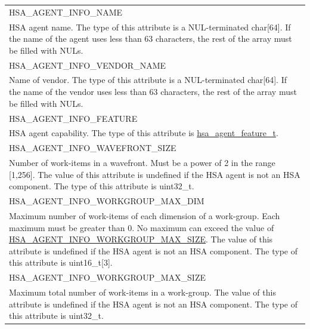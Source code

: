 \documentclass[final,oneside]{book}
\newcommand{\reftyp}[1]{#1}
\newcommand{\refenu}[1]{\reftyp{#1}}
\begin{document}
\begin{longtable}{@{\hspace{2em}}p{\linewidth-2em}}
\hspace{-2em}\refenu{HSA_\-AGENT_\-INFO_\-NAME}\\HSA agent name. The type of this attribute is a NUL-terminated char[64]. If the name of the agent uses less than 63 characters, the rest of the array must be filled with NULs.\\[2mm]
\hspace{-2em}\refenu{HSA_\-AGENT_\-INFO_\-VENDOR_\-NAME}\\Name of vendor. The type of this attribute is a NUL-terminated char[64]. If the name of the vendor uses less than 63 characters, the rest of the array must be filled with NULs.\\[2mm]
\hspace{-2em}\refenu{HSA_\-AGENT_\-INFO_\-FEATURE}\\HSA agent capability. The type of this attribute is \hyperlink{group__agentinfo_1gadf226614ab6da93b301f100cfd58e504}{hsa_\-agent_\-feature_\-t}.\\[2mm]
\hspace{-2em}\refenu{HSA_\-AGENT_\-INFO_\-WAVEFRONT_\-SIZE}\\Number of work-items in a wavefront. Must be a power of 2 in the range [1,256]. The value of this attribute is undefined if the HSA agent is not an HSA component. The type of this attribute is uint32_\-t.\\[2mm]
\hspace{-2em}\refenu{HSA_\-AGENT_\-INFO_\-WORKGROUP_\-MAX_\-DIM}\\Maximum number of work-items of each dimension of a work-group. Each maximum must be greater than 0. No maximum can exceed the value of \hyperlink{group__agentinfo_1gga39d0684207d95717d96319573b3e4a42ade0ccd571bdc023d644d2337621e91f6}{HSA_\-AGENT_\-INFO_\-WORKGROUP_\-MAX_\-SIZE}. The value of this attribute is undefined if the HSA agent is not an HSA component. The type of this attribute is uint16_t[3].\\[2mm]
\hspace{-2em}\refenu{HSA_\-AGENT_\-INFO_\-WORKGROUP_\-MAX_\-SIZE}\\Maximum total number of work-items in a work-group. The value of this attribute is undefined if the HSA agent is not an HSA component. The type of this attribute is uint32_\-t.\\[2mm]

\end{longtable}
\end{document}
